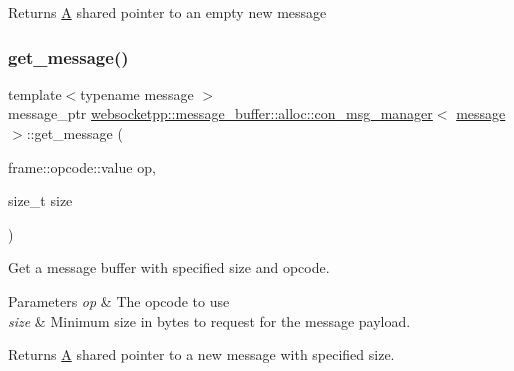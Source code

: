 \begin{DoxyReturn}{Returns}
\mbox{\hyperlink{struct_a}{A}} shared pointer to an empty new message 
\end{DoxyReturn}
\mbox{\label{classwebsocketpp_1_1message__buffer_1_1alloc_1_1con__msg__manager_ab2163fa7f202ebcbad8e77a6b63d8f17}} 
\subsubsection{\texorpdfstring{get\+\_\+message()}{get\_message()}\hspace{0.1cm}{\footnotesize\ttfamily [2/3]}}
{\footnotesize\ttfamily template$<$typename message $>$ \\
message\+\_\+ptr \mbox{\hyperlink{classwebsocketpp_1_1message__buffer_1_1alloc_1_1con__msg__manager}{websocketpp\+::message\+\_\+buffer\+::alloc\+::con\+\_\+msg\+\_\+manager}}$<$ \mbox{\hyperlink{classwebsocketpp_1_1message__buffer_1_1message}{message}} $>$\+::get\+\_\+message (\begin{DoxyParamCaption}\item[{frame\+::opcode\+::value}]{op,  }\item[{size\+\_\+t}]{size }\end{DoxyParamCaption})\hspace{0.3cm}{\ttfamily [inline]}}



Get a message buffer with specified size and opcode. 


\begin{DoxyParams}{Parameters}
{\em op} & The opcode to use \\
\hline
{\em size} & Minimum size in bytes to request for the message payload.\\
\hline
\end{DoxyParams}
\begin{DoxyReturn}{Returns}
\mbox{\hyperlink{struct_a}{A}} shared pointer to a new message with specified size. 
\end{DoxyReturn}
\mbox{\label{classwebsocketpp_1_1message__buffer_1_1alloc_1_1con__msg__manager_a1d7e3db20ccfebb6f5e73fb12fce007c}} 
